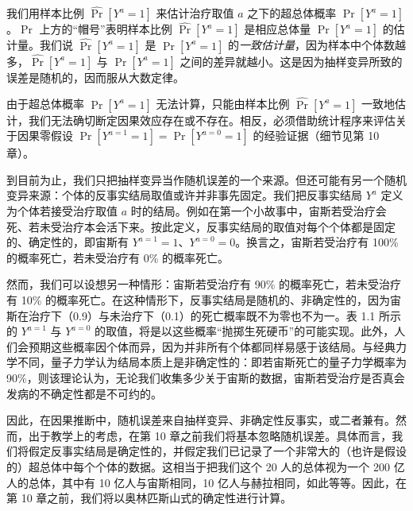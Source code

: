 
我们用样本比例 $\widehat{\Pr}[Y^{a}=1]$ 来估计治疗取值 $a$ 之下的超总体概率 $\Pr[Y^{a}=1]$。$\Pr$ 上方的“帽号”表明样本比例 $\widehat{\Pr}[Y^{a}=1]$ 是相应总体量 $\Pr[Y^{a}=1]$ 的估计量。我们说 $\widehat{\Pr}[Y^{a}=1]$ 是 $\Pr[Y^{a}=1]$ 的\emph{一致估计量}，因为样本中个体数越多，$\widehat{\Pr}[Y^{a}=1]$ 与 $\Pr[Y^{a}=1]$ 之间的差异就越小。这是因为抽样变异所致的误差是随机的，因而服从大数定律。


由于超总体概率 $\Pr[Y^{a}=1]$ 无法计算，只能由样本比例 $\widehat{\Pr}[Y^{a}=1]$ 一致地估计，我们无法确切断定因果效应存在或不存在。相反，必须借助统计程序来评估关于因果零假设 $\Pr[Y^{a=1}=1]=\Pr[Y^{a=0}=1]$ 的经验证据（细节见第 10 章）。


到目前为止，我们只把抽样变异当作随机误差的一个来源。但还可能有另一个随机变异来源：个体的反事实结局取值或许并非事先固定。我们把反事实结局 $Y^{a}$ 定义为个体若接受治疗取值 $a$ 时的结局。例如在第一个小故事中，宙斯若受治疗会死、若未受治疗本会活下来。按此定义，反事实结局的取值对每个个体都是固定的、确定性的，即宙斯有 $Y^{a=1}=1$、$Y^{a=0}=0$。换言之，宙斯若受治疗有 100\% 的概率死亡，若未受治疗有 0\% 的概率死亡。


然而，我们可以设想另一种情形：宙斯若受治疗有 90\% 的概率死亡，若未受治疗有 10\% 的概率死亡。在这种情形下，反事实结局是随机的、非确定性的，因为宙斯在治疗下（0.9）与未治疗下（0.1）的死亡概率既不为零也不为一。表 1.1 所示的 $Y^{a=1}$ 与 $Y^{a=0}$ 的取值，将是以这些概率“抛掷生死硬币”的可能实现。此外，人们会预期这些概率因个体而异，因为并非所有个体都同样易感于该结局。与经典力学不同，量子力学认为结局本质上是非确定性的：即若宙斯死亡的量子力学概率为 90\%，则该理论认为，无论我们收集多少关于宙斯的数据，宙斯若受治疗是否真会发病的不确定性都是不可约的。

因此，在因果推断中，随机误差来自抽样变异、非确定性反事实，或二者兼有。然而，出于教学上的考虑，在第 10 章之前我们将基本忽略随机误差。具体而言，我们将假定反事实结局是确定性的，并假定我们已记录了一个非常大的（也许是假设的）超总体中每个个体的数据。这相当于把我们这个 20 人的总体视为一个 200 亿人的总体，其中有 10 亿人与宙斯相同，10 亿人与赫拉相同，如此等等。因此，在第 10 章之前，我们将以奥林匹斯山式的确定性进行计算。

